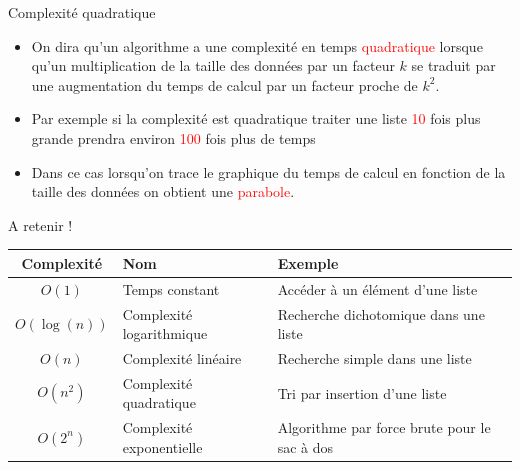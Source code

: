 \documentclass[10pt]{beamer}
\begin{document}
\begin{frame}
	\mframe{\DR}
	\begin{block}{Complexité quadratique}
		\begin{itemize}
			\item<2-> On dira qu'un algorithme a une complexité en temps \textcolor{red}{quadratique} lorsque qu'un multiplication de la taille des données par un facteur $k$ se traduit par une augmentation du temps de calcul par un facteur proche de $k^2$.
			\item<3-> Par exemple si la complexité est quadratique traiter une liste \textcolor{red}{10} fois plus grande prendra environ \textcolor{red}{100} fois plus de temps
			\item<4-> Dans ce cas lorsqu'on trace le graphique du temps de calcul en fonction de la taille des données on obtient une \textcolor{red}{parabole}.
		\end{itemize}
	\end{block}
\end{frame}

\begin{frame}
	\mframe{\DR}
	\begin{alertblock}{A retenir !}
		\begin{tabularx}{\textwidth}{|c|p{4cm}|X|}
            \hline
            Complexité & Nom & Exemple \\
            \hline
            $O(1)$ & Temps constant & Accéder à un élément d'une liste \\
            \hline
            $O(\log(n))$ & Complexité logarithmique & Recherche dichotomique dans une liste \\
			\hline
            $O(n)$ & Complexité linéaire & Recherche simple dans une liste \\
            \hline
            $O(n^2)$ & Complexité quadratique & Tri par insertion d'une liste \\
            \hline
            $O(2^n)$ & Complexité exponentielle & Algorithme par force brute pour le sac à dos \\
            \hline
		\end{tabularx}
	\end{alertblock}
\end{frame}
\end{document}
